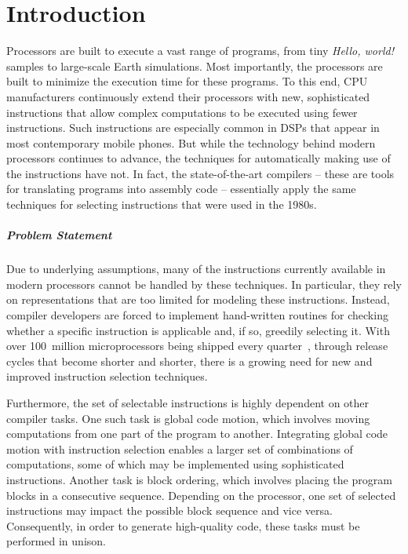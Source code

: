 %

\chapter{Introduction}

\enlargethispage{3pt}

Processors are built to execute a vast range of \glspl{program}, from tiny
\emph{Hello, world!} samples to large-scale Earth simulations.
%
Most importantly, the processors are built to minimize the execution time for
these \glspl{program}.
%
To this end, CPU manufacturers continuously extend their processors with new,
sophisticated \glspl{instruction} that allow complex computations to be executed
using fewer \glspl{instruction}.
%
Such \glspl{instruction} are especially common in \glspl{DSP} that appear in
most contemporary mobile phones.
%
But while the technology behind modern processors continues to advance, the
techniques for automatically making use of the \glspl{instruction} have not.
%
In fact, the state-of-the-art \glspl{compiler} -- these are tools for
translating \glspl{program} into \gls{assembly code} -- essentially apply the
same techniques for selecting \glspl{instruction} that were used in the 1980s.


\paragraph{Problem Statement}

Due to underlying assumptions, many of the \glspl{instruction} currently
available in modern processors cannot be handled by these techniques.
%
In particular, they rely on representations that are too limited for modeling
these \glspl{instruction}.
%
Instead, \gls{compiler} developers are forced to implement hand-written routines
for checking whether a specific \gls{instruction} is applicable and, if so,
greedily selecting it.
%
With over \num{100}~million microprocessors being shipped every
quarter~\cite{Intel:2014:NewsRelease}, through release cycles that become
shorter and shorter, there is a growing need for new and improved
\gls{instruction selection} techniques.

Furthermore, the set of selectable \glspl{instruction} is highly dependent on
other \gls{compiler} tasks.
%
One such task is \gls{global code motion}, which involves moving computations
from one part of the \gls{program} to another.
%
Integrating \gls{global code motion} with \gls{instruction selection} enables a
larger set of combinations of computations, some of which may be implemented
using sophisticated \glspl{instruction}.
%
Another task is \gls{block ordering}, which involves placing the \gls{program}
\glspl{block} in a consecutive sequence.
%
Depending on the processor, one set of selected \glspl{instruction} may impact
the possible \gls{block} sequence and vice versa.
%
Consequently, in order to generate high-quality code, these tasks must be
performed in unison.


